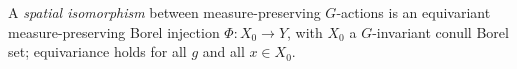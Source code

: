 
A \emph{spatial isomorphism} between measure-preserving $G$-actions is an equivariant measure-preserving Borel injection $\Phi:X_0\to Y$, with $X_0$ a $G$-invariant conull Borel set; equivariance holds for all $g$ and all $x\in X_0$.
